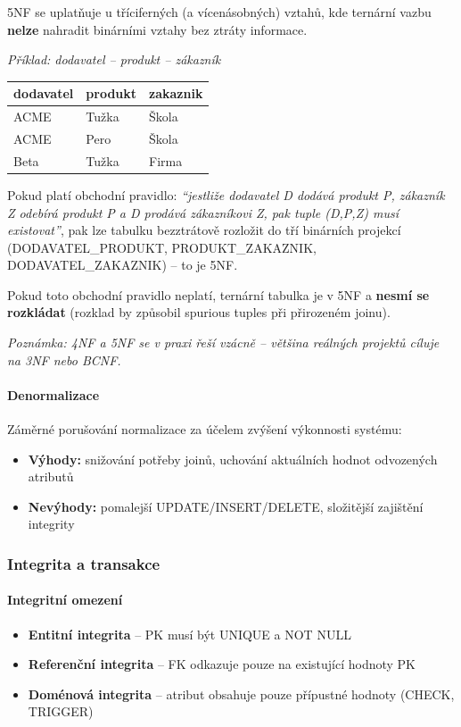 5NF se uplatňuje u tříciferných (a vícenásobných) vztahů, kde ternární vazbu \textbf{nelze}
nahradit binárními vztahy bez ztráty informace.

\smallskip
\textit{Příklad: dodavatel -- produkt -- zákazník}
\begin{center}\footnotesize
\begin{tabular}{lll}
\toprule
dodavatel & produkt & zakaznik \\
\midrule
ACME & Tužka & Škola \\
ACME & Pero & Škola \\
Beta & Tužka & Firma \\
\bottomrule
\end{tabular}
\end{center}

Pokud platí obchodní pravidlo: \textit{``jestliže dodavatel D dodává produkt P, zákazník Z odebírá produkt P
a D prodává zákazníkovi Z, pak tuple (D,P,Z) musí existovat''}, pak lze tabulku bezztrátově rozložit
do tří binárních projekcí (DODAVATEL\_PRODUKT, PRODUKT\_ZAKAZNIK, DODAVATEL\_ZAKAZNIK) -- to je 5NF.

Pokud toto obchodní pravidlo neplatí, ternární tabulka je v 5NF a \textbf{nesmí se rozkládat}
(rozklad by způsobil spurious tuples při přirozeném joinu).

\smallskip
\textit{Poznámka: 4NF a 5NF se v praxi řeší vzácně -- většina reálných projektů cíluje na 3NF nebo BCNF.}

\paragraph{Denormalizace}
Záměrné porušování normalizace za účelem zvýšení výkonnosti systému:
\begin{itemize}
  \item \textbf{Výhody:} snižování potřeby joinů, uchování aktuálních hodnot odvozených atributů
  \item \textbf{Nevýhody:} pomalejší UPDATE/INSERT/DELETE, složitější zajištění integrity
\end{itemize}

\subsubsection{Integrita a transakce}

\paragraph{Integritní omezení}
\begin{itemize}
  \item \textbf{Entitní integrita} -- PK musí být UNIQUE a NOT NULL
  \item \textbf{Referenční integrita} -- FK odkazuje pouze na existující hodnoty PK
  \item \textbf{Doménová integrita} -- atribut obsahuje pouze přípustné hodnoty (CHECK, TRIGGER)
\end{itemize}

